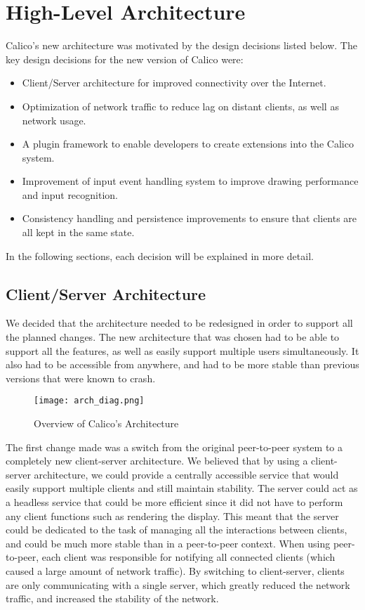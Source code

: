 \chapter{High-Level Architecture}

Calico's new architecture was motivated by the design decisions listed below. 
The key design decisions for the new version of Calico were:

\begin{itemize}\itemsep1pt
  \item Client/Server architecture for improved connectivity over the Internet.
  \item Optimization of network traffic to reduce lag on distant clients, as well as network usage.
  \item A plugin framework to enable developers to create extensions into the Calico system.
  \item Improvement of input event handling system to improve drawing performance and input recognition.
  \item Consistency handling and persistence improvements to ensure that clients are all kept in the same state.
\end{itemize}

In the following sections, each decision will be explained in more detail.



\section{Client/Server Architecture}
We decided that the architecture needed to be redesigned in order to support all the planned changes. The new architecture that was chosen had to be able to support all the features, as well as easily support multiple users simultaneously. It also had to be accessible from anywhere, and had to be more stable than previous versions that were known to crash.

\begin{figure}[h]
\centering
\texttt{[image: arch\_diag.png]}
\caption{Overview of Calico's Architecture}
\label{fig:calico_arch}
\end{figure}

The first change made was a switch from the original peer-to-peer system to a completely new client-server architecture. We believed that by using a client-server architecture, we could provide a centrally accessible service that would easily support multiple clients and still maintain stability. The server could act as a headless service that could be more efficient since it did not have to perform any client functions such as rendering the display. This meant that the server could be dedicated to the task of managing all the interactions between clients, and could be much more stable than in a peer-to-peer context. When using peer-to-peer, each client was responsible for notifying all connected clients (which caused a large amount of network traffic). By switching to client-server, clients are only communicating with a single server, which greatly reduced the network traffic, and increased the stability of the network.

